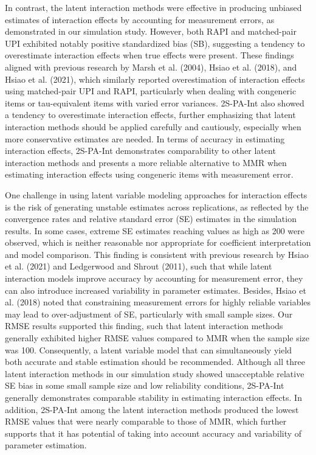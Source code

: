 \documentclass[
  man,mask]{apa6}
\begin{document}
In contrast, the latent interaction methods were effective in producing unbiased estimates of interaction effects by accounting for measurement errors, as demonstrated in our simulation study. However, both RAPI and matched-pair UPI exhibited notably positive standardized bias (SB), suggesting a tendency to overestimate interaction effects when true effects were present. These findings aligned with previous research by Marsh et al. (2004), Hsiao et al. (2018), and Hsiao et al. (2021), which similarly reported overestimation of interaction effects using matched-pair UPI and RAPI, particularly when dealing with congeneric items or tau-equivalent items with varied error variances. 2S-PA-Int also showed a tendency to overestimate interaction effects, further emphasizing that latent interaction methods should be applied carefully and cautiously, especially when more conservative estimates are needed. In terms of accuracy in estimating interaction effects, 2S-PA-Int demonstrates comparability to other latent interaction methods and presents a more reliable alternative to MMR when estimating interaction effects using congeneric items with measurement error.

One challenge in using latent variable modeling approaches for interaction effects is the risk of generating unstable estimates across replications, as reflected by the convergence rates and relative standard error (SE) estimates in the simulation results. In some cases, extreme SE estimates reaching values as high as 200 were observed, which is neither reasonable nor appropriate for coefficient interpretation and model comparison. This finding is consistent with previous research by Hsiao et al. (2021) and Ledgerwood and Shrout (2011), such that while latent interaction models improve accuracy by accounting for measurement error, they can also introduce increased variability in parameter estimates. Besides, Hsiao et al. (2018) noted that constraining measurement errors for highly reliable variables may lead to over-adjustment of SE, particularly with small sample sizes. Our RMSE results supported this finding, such that latent interaction methods generally exhibited higher RMSE values compared to MMR when the sample size was 100. Consequently, a latent variable model that can simultaneously yield both accurate and stable estimation should be recommended. Although all three latent interaction methods in our simulation study showed unacceptable relative SE bias in some small sample size and low reliability conditions, 2S-PA-Int generally demonstrates comparable stability in estimating interaction effects. In addition, 2S-PA-Int among the latent interaction methods produced the lowest RMSE values that were nearly comparable to those of MMR, which further supports that it has potential of taking into account accuracy and variability of parameter estimation.
\end{document}
